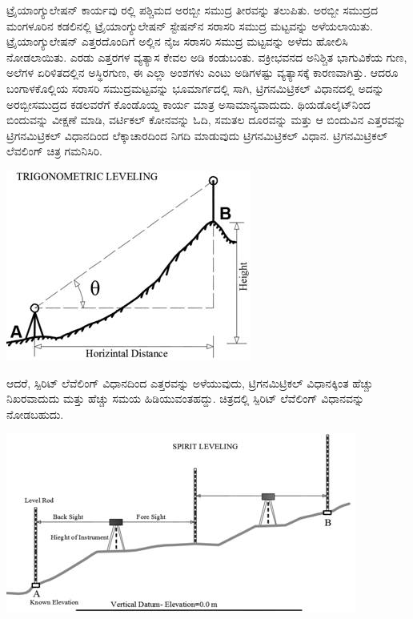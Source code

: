 ಟ್ರೈಯಾಂಗ್ಯುಲೇಷನ್​ ಕಾರ್ಯವು  ರಲ್ಲಿ ಪಶ್ಚಿಮದ ಅರಬ್ಬೀ ಸಮುದ್ರ ತೀರವನ್ನು ತಲುಪಿತು. ಅರಬ್ಬೀ ಸಮುದ್ರದ ಮಂಗಳೂರಿನ ಕಡಲಿನಲ್ಲಿ ಟ್ರೈಯಾಂಗ್ಯುಲೇಷನ್​ ಸ್ಟೇಷನ್​ನ ಸರಾಸರಿ ಸಮುದ್ರ ಮಟ್ಟವನ್ನು ಅಳೆಯಲಾಯಿತು. ಟ್ರೈಯಾಂಗ್ಯುಲೇಷನ್​ ಎತ್ತರದೊಂದಿಗೆ ಅಲ್ಲಿನ ನೈಜ ಸರಾಸರಿ ಸಮುದ್ರ ಮಟ್ಟವನ್ನು ಅಳೆದು ಹೋಲಿಸಿ ನೋಡಲಾಯಿತು. ಎರಡು ಎತ್ತರಗಳ ವ್ಯತ್ಯಾಸ ಕೇವಲ  ಅಡಿ ಕಂಡುಬಂತು. ವಕ್ರೀಭವನದ ಅನಿಶ್ಚಿತ ಭಾಗುವಿಕೆಯ ಗುಣ, ಅಲೆಗಳ ಏರಿಳಿತದಲ್ಲಿನ ಅಸ್ಥಿರಗುಣ, ಈ ಎಲ್ಲಾ ಅಂಶಗಳು ಎಂಟು ಅಡಿಗಳಷ್ಟು ವ್ಯತ್ಯಾಸಕ್ಕೆ ಕಾರಣವಾಗಿತ್ತು. ಆದರೂ ಬಂಗಾಳಕೊಲ್ಲಿಯ ಸರಾಸರಿ ಸಮುದ್ರಮಟ್ಟವನ್ನು ಭೂಮಾರ್ಗದಲ್ಲಿ ಸಾಗಿ, ಟ್ರಿಗನಮಿಟ್ರಿಕಲ್​ ವಿಧಾನದಲ್ಲಿ ಅದನ್ನು ಅರಬ್ಬೀಸಮುದ್ರದ ಕಡಲವರೆಗೆ ಕೊಂಡೊಯ್ದ ಕಾರ್ಯ ಮಾತ್ರ ಅಸಾಮಾನ್ಯವಾದುದು. ಥಿಯಡೊಲೈಟ್​ನಿಂದ ಬಿಂದುವನ್ನು ವೀಕ್ಷಣೆ ಮಾಡಿ, ವರ್ಟಿಕಲ್​ ಕೋನವನ್ನು ಓದಿ, ಸಮತಲ ದೂರವನ್ನು ಮತ್ತು ಆ ಬಿಂದುವಿನ ಎತ್ತರವನ್ನು ಟ್ರಿಗನಮಿಟ್ರಿಕಲ್​ ವಿಧಾನದಿಂದ ಲೆಕ್ಕಾಚಾರದಿಂದ ನಿಗದಿ ಮಾಡುವುದು ಟ್ರಿಗನಮಿಟ್ರಿಕಲ್​ ವಿಧಾನ. ಟ್ರಿಗನಮಿಟ್ರಿಕಲ್​ ಲೆವಲಿಂಗ್​ ಚಿತ್ರ ಗಮನಿಸಿರಿ.

\begin{center}
\includegraphics[scale=0.7]{"images/image010.jpg"}
\end{center}

ಆದರೆ, ಸ್ಪಿರಿಟ್​ ಲೆವೆಲಿಂಗ್​ ವಿಧಾನದಿಂದ ಎತ್ತರವನ್ನು ಅಳೆಯುವುದು, ಟ್ರಿಗನಮಿಟ್ರಿಕಲ್​ ವಿಧಾನಕ್ಕಿಂತ ಹೆಚ್ಚು ನಿಖರವಾದುದು ಮತ್ತು ಹೆಚ್ಚು ಸಮಯ ಹಿಡಿಯುವಂತಹದ್ದು. ಚಿತ್ರದಲ್ಲಿ ಸ್ಪಿರಿಟ್​ ಲೆವೆಲಿಂಗ್​ ವಿಧಾನವನ್ನು ನೋಡಬಹುದು.

\begin{center}
\includegraphics[scale=0.7]{"images/image011.jpg"}
\end{center}

